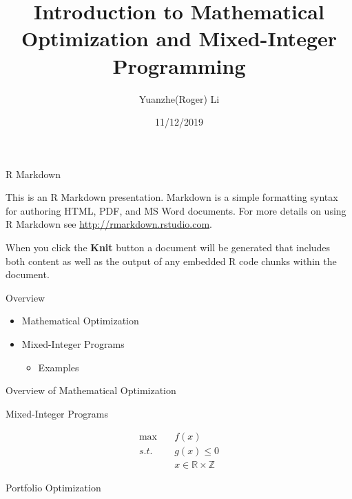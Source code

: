 \documentclass[
  ignorenonframetext,
]{beamer}
\title{Introduction to Mathematical Optimization and Mixed-Integer Programming}
\author{Yuanzhe(Roger) Li}
\date{11/12/2019}
\providecommand{\tightlist}{%
  \setlength{\itemsep}{0pt}\setlength{\parskip}{0pt}}
\begin{document}
\frame{\titlepage}

\begin{frame}{R Markdown}
\protect\hypertarget{r-markdown}{}

This is an R Markdown presentation. Markdown is a simple formatting
syntax for authoring HTML, PDF, and MS Word documents. For more details
on using R Markdown see \url{http://rmarkdown.rstudio.com}.

When you click the \textbf{Knit} button a document will be generated
that includes both content as well as the output of any embedded R code
chunks within the document.

\end{frame}

\begin{frame}{Overview}
\protect\hypertarget{overview}{}

\begin{itemize}
\tightlist
\item
  Mathematical Optimization
\item
  Mixed-Integer Programs

  \begin{itemize}
  \tightlist
  \item
    Examples
  \end{itemize}
\end{itemize}

\end{frame}

\begin{frame}{Overview of Mathematical Optimization}
\protect\hypertarget{overview-of-mathematical-optimization}{}

\end{frame}

\begin{frame}{Mixed-Integer Programs}
\protect\hypertarget{mixed-integer-programs}{}

\[\begin{aligned}
\max \quad & f(x)\\
s.t. \quad & g(x) \leq 0 \\
& x \in \mathbb{R} \times \mathbb{Z}
\end{aligned}\]

\end{frame}

\begin{frame}{Portfolio Optimization}
\protect\hypertarget{portfolio-optimization}{}

\end{frame}
\end{document}
